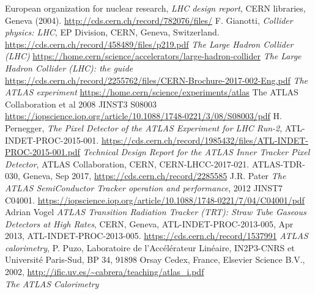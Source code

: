 \documentclass[a4paper, oneside, 11pt, openright]{book}
\begin{document}
	
	\clearpage	
	\begin{thebibliography}{32}
			
			 European organization for nuclear research, \textit{LHC design report}, CERN libraries, Geneva (2004). \url{http://cds.cern.ch/record/782076/files/}
			 F. Gianotti, \textit{Collider physics: LHC}, EP Division, CERN, Geneva, Switzerland. \url{https://cds.cern.ch/record/458489/files/p219.pdf}
			\textit{The Large Hadron Collider (LHC)}
			\url{https://home.cern/science/accelerators/large-hadron-collider}
			\textit{The Large Hadron Collider (LHC): the guide}
			\url{https://cds.cern.ch/record/2255762/files/CERN-Brochure-2017-002-Eng.pdf}
			\textit{The ATLAS experiment}
			\url{https://home.cern/science/experiments/atlas}
			  The ATLAS Collaboration et al 2008 JINST3 S08003
			\url{https://iopscience.iop.org/article/10.1088/1748-0221/3/08/S08003/pdf}
			 H. Pernegger, \textit{The Pixel Detector of the ATLAS Experiment for LHC Run-2}, ATL-INDET-PROC-2015-001. \url{https://cds.cern.ch/record/1985432/files/ATL-INDET-PROC-2015-001.pdf}
			\textit{Technical Design Report for the ATLAS Inner Tracker Pixel Detector}, ATLAS Collaboration, CERN, CERN-LHCC-2017-021. ATLAS-TDR-030, Geneva, Sep 2017, \url{https://cds.cern.ch/record/2285585}
			 J.R. Pater \textit{The ATLAS SemiConductor Tracker operation and performance}, 2012 JINST7 C04001. \url{https://iopscience.iop.org/article/10.1088/1748-0221/7/04/C04001/pdf}
			 Adrian Vogel \textit{ATLAS Transition Radiation Tracker (TRT): Straw Tube Gaseous Detectors at High Rates}, CERN,
			Geneva, ATL-INDET-PROC-2013-005, Apr 2013, ATL-INDET-PROC-2013-005. \url{https://cds.cern.ch/record/1537991}
			\textit{ATLAS calorimetry}, P. Puzo, Laboratoire de l’Accélérateur Linéaire, IN2P3-CNRS et Université Paris-Sud, BP 34, 91898 Orsay Cedex, France, Elsevier Science B.V., 2002,
			\url{http://ific.uv.es/~cabrera/teaching/atlas_i.pdf}\\
			\textit{The ATLAS Calorimetry}

\end{thebibliography}
\end{document}

